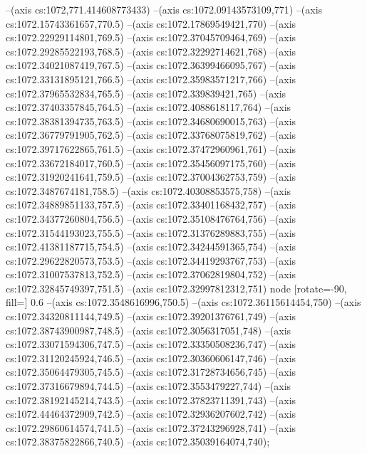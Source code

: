--(axis cs:1072,771.414608773433)
--(axis cs:1072.09143573109,771)
--(axis cs:1072.15743361657,770.5)
--(axis cs:1072.17869549421,770)
--(axis cs:1072.22929114801,769.5)
--(axis cs:1072.37045709464,769)
--(axis cs:1072.29285522193,768.5)
--(axis cs:1072.32292714621,768)
--(axis cs:1072.34021087419,767.5)
--(axis cs:1072.36399466095,767)
--(axis cs:1072.33131895121,766.5)
--(axis cs:1072.35983571217,766)
--(axis cs:1072.37965532834,765.5)
--(axis cs:1072.339839421,765)
--(axis cs:1072.37403357845,764.5)
--(axis cs:1072.4088618117,764)
--(axis cs:1072.38381394735,763.5)
--(axis cs:1072.34680690015,763)
--(axis cs:1072.36779791905,762.5)
--(axis cs:1072.33768075819,762)
--(axis cs:1072.39717622865,761.5)
--(axis cs:1072.37472960961,761)
--(axis cs:1072.33672184017,760.5)
--(axis cs:1072.35456097175,760)
--(axis cs:1072.31920241641,759.5)
--(axis cs:1072.37004362753,759)
--(axis cs:1072.3487674181,758.5)
--(axis cs:1072.40308853575,758)
--(axis cs:1072.34889851133,757.5)
--(axis cs:1072.33401168432,757)
--(axis cs:1072.34377260804,756.5)
--(axis cs:1072.35108476764,756)
--(axis cs:1072.31544193023,755.5)
--(axis cs:1072.31376289883,755)
--(axis cs:1072.41381187715,754.5)
--(axis cs:1072.34244591365,754)
--(axis cs:1072.29622820573,753.5)
--(axis cs:1072.34419293767,753)
--(axis cs:1072.31007537813,752.5)
--(axis cs:1072.37062819804,752)
--(axis cs:1072.32845749397,751.5)
--(axis cs:1072.32997812312,751) node [rotate=-90, fill=\bgcol] {0.6}
--(axis cs:1072.3548616996,750.5)
--(axis cs:1072.36115614454,750)
--(axis cs:1072.34320811144,749.5)
--(axis cs:1072.39201376761,749)
--(axis cs:1072.38743900987,748.5)
--(axis cs:1072.3056317051,748)
--(axis cs:1072.33071594306,747.5)
--(axis cs:1072.33350508236,747)
--(axis cs:1072.31120245924,746.5)
--(axis cs:1072.30360606147,746)
--(axis cs:1072.35064479305,745.5)
--(axis cs:1072.31728734656,745)
--(axis cs:1072.37316679894,744.5)
--(axis cs:1072.3553479227,744)
--(axis cs:1072.38192145214,743.5)
--(axis cs:1072.37823711391,743)
--(axis cs:1072.44464372909,742.5)
--(axis cs:1072.32936207602,742)
--(axis cs:1072.29860614574,741.5)
--(axis cs:1072.37243296928,741)
--(axis cs:1072.38375822866,740.5)
--(axis cs:1072.35039164074,740);

